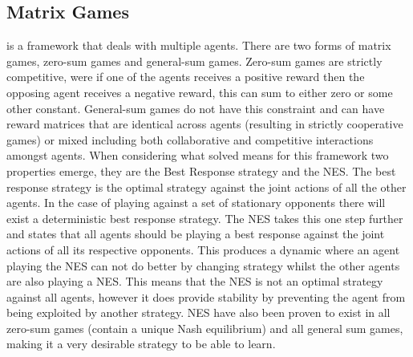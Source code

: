 \documentclass[conference]{IEEEtran}
\begin{document}
\subsection{Matrix Games} is a framework that deals with multiple agents\cite{basar1999dynamic}. There are two forms of matrix games, zero-sum games and general-sum games. Zero-sum games are strictly competitive, were if one of the agents receives a positive reward then the opposing agent receives a negative reward, this can sum to either zero or some other constant. General-sum games do not have this constraint and can have reward matrices that are identical across agents (resulting in strictly cooperative games) or mixed including both collaborative and competitive interactions amongst agents. When considering what solved means for this framework two properties emerge, they are the Best Response strategy and the NES\cite{basar1999dynamic}. The best response strategy is the optimal strategy against the joint actions of all the other agents. In the case of playing against a set of stationary opponents there will exist a deterministic best response strategy. The NES takes this one step further and states that all agents should be playing a best response against the joint actions of all its respective opponents. This produces a dynamic where an agent playing the NES can not do better by changing strategy whilst the other agents are also playing a NES. This means that the NES is not an optimal strategy against all agents, however it does provide stability by preventing the agent from being exploited by another strategy. NES have also been proven to exist in all zero-sum games (contain a unique Nash equilibrium) and all general sum games, making it a very desirable strategy to be able to learn.
\end{document}
